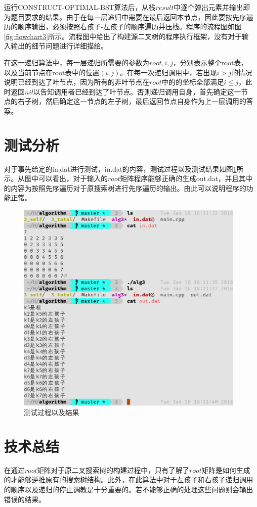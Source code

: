 \documentclass{report}
\begin{document}
运行CONSTRUCT-OPTIMAL-BST算法后，从栈$result$中逐个弹出元素并输出即为题目要求的结果。由于在每一层递归中需要在最后返回本节点，因此要按先序遍历的顺序输出，必须按照右孩子-左孩子的顺序遍历并压栈。程序的流程图如图\ref{fig:flowchart3}所示。流程图中给出了构建源二叉树的程序执行框架，没有对于输入输出的细节问题进行详细描绘。\par

在这一递归算法中，每一层递归所需要的参数为$root, i, j$，分别表示整个root表，以及当前节点在root表中的位置$(i, j)$。在每一次递归调用中，若出现$i>j$的情况说明已经到达了叶节点，因为所有的非叶节点在$root$中的的坐标全部满足$i\leq j$，此时返回$nil$以告知调用者已经到达了叶节点。否则递归调用自身，首先确定这一节点的右子树，然后确定这一节点的左子树，最后返回节点自身作为上一层调用的答案。

\section{测试分析}
\label{sec:ce_shi_fen_xi_3}
对于事先给定的in.dat进行测试，in.dat的内容，测试过程以及测试结果如图\ref{fig:result3}所示。从图中可以看出，对于输入的$root$矩阵程序能够正确的生成out.dat，并且其中的内容为按照先序遍历对于原搜索树进行先序遍历的输出。由此可以说明程序的功能正常。

\begin{figure}[ht]
    \centering
    \includegraphics[width=0.65\linewidth]{result3.png}
    \caption{测试过程以及结果}
    \label{fig:result3}
\end{figure}

\section{技术总结}
\label{sec:ji_zhu_zong_jie_3}
在通过$root$矩阵对于原二叉搜索树的构建过程中，只有了解了$root$矩阵是如何生成的才能够逆推原有的搜索树结构。此外，在此算法中对于左孩子和右孩子递归调用的顺序以及递归的停止调教是十分重要的。若不能够正确的处理这些问题则会输出错误的结果。
\end{document}
